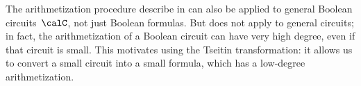 The arithmetization procedure describe in  can also be applied to general Boolean circuits~$\calC$, not just Boolean formulas.
But  does not apply to general circuits;
in fact, the arithmetization of a Boolean circuit can have very high degree, even if that circuit is small.
This motivates using the Tseitin transformation: it allows us to convert a small circuit into a small formula, which has a low-degree arithmetization.


